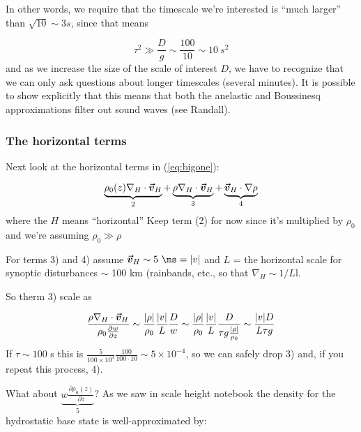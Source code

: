\documentclass[12pt]{article}
\begin{document}
In other words, we require that the timescale we're interested is
``much larger'' than $\sqrt{10} \sim 3 s$, since that means

\begin{equation}
  \label{eq:comp1b}
  \tau^2 \gg \frac{ D}{g}  \sim \frac{100 }{10} \sim 10\ s^2
\end{equation}
and as we increase the size of the scale of interest $D$, we have
to recognize that we can only ask questions about longer timescales
(several minutes).  It is possible to show explicitly that
this means that both the anelastic and Boussinesq approximations
filter out sound waves (see Randall).


\subsubsection{The horizontal terms}
\label{sec:horizontal-terms}


Next look at the horizontal terms in (\ref{eq:bigone}):

\begin{equation}
  \label{eq:horiz}
  \underbrace{\rho_0(z) \nabla_H \cdot \boldsymbol{\vec{v}}_H}_2 + 
\underbrace{\rho \nabla_H \cdot \boldsymbol{\vec{v}}_H}_3 +
\underbrace{\boldsymbol{\vec{v}}_H \cdot \nabla \rho}_4 
\end{equation}
where the $H$ means ``horizontal''
Keep term (2) for now since it's multiplied by $\rho_0$ and we're
assuming $\rho_0 \gg \rho$

For terms 3) and 4) assume $\vect{v}_H \sim 5\ \ms = |v|$ and $L$ =
the horizontal scale for synoptic disturbances $\sim$ 100 km (rainbands,
etc., so that  $\nabla_H \sim 1/L$l.

So therm 3) scale as 

\begin{equation}
  \label{eq:scaleH}
  \frac{\rho \nabla_H \cdot \boldsymbol{\vec{v}}_H }{\rho_0 \frac{ \partial w}{\partial z} }
\sim \frac{|\rho| }{\rho_0} \frac{|v| }{L}  \frac{ D}{w} 
\sim \frac{|\rho| }{\rho_0} \frac{|v| }{L} \frac{D }{\tau g \frac{|\rho| }{\rho_0} }  \sim \frac{|v| D }{L \tau g} 
\end{equation}
If $\tau \sim 100$ s this is $\frac{5 }{100 \times 10^3} 
\frac{100 }{100 \cdot 10}  \sim 5 \times 10^{-4}$, so we can safely drop
3) and,
 if you repeat this process, 4).

 What about $\underbrace{w \frac{\partial \rho_0(z) }{\partial z}}_5$?  As we saw in scale height
notebook the density for the
hydrostatic base state is well-approximated by:
\end{document}
